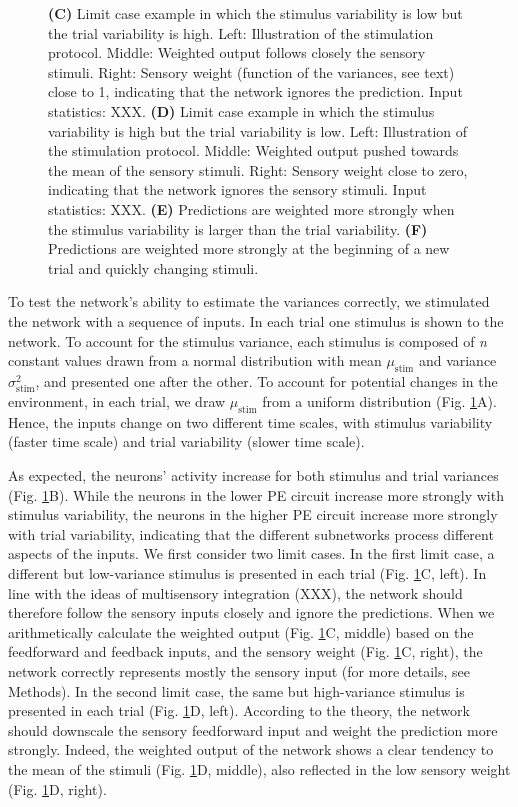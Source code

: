 \documentclass[10pt,a4paper,draft]{article}
\begin{document}
\begin{figure}[t!]
{{\bf (C)} Limit case example in which the stimulus variability is low but the trial variability is high. Left: Illustration of the stimulation protocol. Middle: Weighted output follows closely the sensory stimuli. Right: Sensory weight (function of the variances, see text) close to 1, indicating that the network ignores the prediction. Input statistics: XXX.
{\bf (D)} Limit case example in which the stimulus variability is high but the trial variability is low. Left: Illustration of the stimulation protocol. Middle: Weighted output pushed towards the mean of the sensory stimuli. Right: Sensory weight close to zero, indicating that the network ignores the sensory stimuli. Input statistics: XXX.
{\bf (E)} Predictions are weighted more strongly when the stimulus variability is larger than the trial variability.
{\bf (F)} Predictions are weighted more strongly at the beginning of a new trial and quickly changing stimuli.
}
\label{fig:Fig_3}
\end{figure}
%

To test the network's ability to estimate the variances correctly, we stimulated the network with a sequence of inputs. In each trial one stimulus is shown to the network. To account for the stimulus variance, each stimulus is composed of \textit{n} constant values drawn from a normal distribution with mean $\mu_\mathrm{stim}$ and variance $\sigma_\mathrm{stim}^2$, and presented one after the other. To account for potential changes in the environment, in each trial, we draw $\mu_\mathrm{stim}$ from a uniform distribution (Fig. \ref{fig:Fig_3}A). Hence, the inputs change on two different time scales, with stimulus variability (faster time scale) and trial variability (slower time scale).

As expected, the neurons' activity increase for both stimulus and trial variances (Fig. \ref{fig:Fig_3}B). While the neurons in the lower PE circuit increase more strongly with stimulus variability, the neurons in the higher PE circuit increase more strongly with trial variability, indicating that the different subnetworks process different aspects of the inputs. We first consider two limit cases. In the first limit case, a different but low-variance stimulus is presented in each trial (Fig. \ref{fig:Fig_3}C, left). In line with the ideas of multisensory integration (XXX), the network should therefore follow the sensory inputs closely and ignore the predictions. When we arithmetically calculate the weighted output (Fig. \ref{fig:Fig_3}C, middle) based on the feedforward and feedback inputs, and the sensory weight (Fig. \ref{fig:Fig_3}C, right), the network correctly represents mostly the sensory input (for more details, see Methods). In the second limit case, the same but high-variance stimulus is presented in each trial (Fig. \ref{fig:Fig_3}D, left). According to the theory, the network should downscale the sensory feedforward input and weight the prediction more strongly. Indeed, the weighted output of the network shows a clear tendency to the mean of the stimuli (Fig. \ref{fig:Fig_3}D, middle), also reflected in the low sensory weight (Fig. \ref{fig:Fig_3}D, right). 
\end{document}
